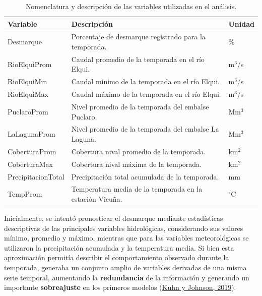\documentclass[12pt]{report}
\newcommand{\citeref}[2]{\hyperlink{ref:#1}{#2}}
\begin{document}
\begin{table}[H]
\centering
\caption{Nomenclatura y descripción de las variables utilizadas en el análisis.}
\label{tab:variables_modelo}
\begin{tabular}{lll}
\hline
\textbf{Variable} & \textbf{Descripción} & \textbf{Unidad} \\
\hline
Desmarque & Porcentaje de desmarque registrado para la temporada. & \% \\
RioElquiProm & Caudal promedio de la temporada en el río Elqui. & m$^{3}$/s \\
RioElquiMin & Caudal mínimo de la temporada en el río Elqui. & m$^{3}$/s \\
RioElquiMax & Caudal máximo de la temporada en el río Elqui. & m$^{3}$/s \\
PuclaroProm & Nivel promedio de la temporada del embalse Puclaro. & Mm$^{3}$ \\
LaLagunaProm & Nivel promedio de la temporada del embalse La Laguna. & Mm$^{3}$ \\
CoberturaProm & Cobertura nival promedio de la temporada. & km$^{2}$ \\
CoberturaMax & Cobertura nival máxima de la temporada. & km$^{2}$ \\
PrecipitacionTotal & Precipitación total acumulada de la temporada. & mm \\
TempProm & Temperatura media de la temporada  en la estación Vicuña. & $^\circ$C \\
\hline
\end{tabular}
\end{table}

Inicialmente, se intentó pronosticar el desmarque mediante estadísticas descriptivas de las principales variables hidrológicas, considerando sus valores mínimo, promedio y máximo, mientras que para las variables meteorológicas se utilizaron la precipitación acumulada y la temperatura media. Si bien esta aproximación permitía describir el comportamiento observado durante la temporada, generaba un conjunto amplio de variables derivadas de una misma serie temporal, aumentando la \textbf{redundancia} de la información y generando un importante \textbf{sobreajuste} en los primeros modelos (\citeref{kuhn2019}{Kuhn y Johnson, 2019}).
\end{document}
